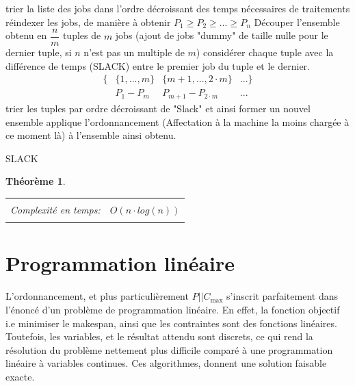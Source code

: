 \documentclass[a4paper,12pt]{report}
\theoremstyle{plain}				%
\newtheorem{theoreme}{Théorème}	%
\theoremstyle{definition}				%
\newcommand\problemGrahamP{$P||C_{\max}$\xspace}
\begin{document}
\bigskip
\begin{algorithm}[H]
\DontPrintSemicolon

trier la liste des jobs dans l'ordre décroissant des temps nécessaires de traitements \;
réindexer les jobs, de manière à obtenir $P_1 \geq P_2 \geq ... \geq P_n$ \;
Découper l'ensemble obtenu en $\dfrac{n}{m}$ tuples de $m$ jobs (ajout
de jobs "dummy" de taille nulle pour le dernier tuple, si $n$ n'est
pas un multiple de $m$) \;
considérer chaque tuple avec la différence de temps (SLACK) entre le
premier job du tuple et le dernier.
\begin{align*}
\{ &\{1, ..., m\} &\{m+1,..., 2 \cdot m\} &... \} \\
   &P_1 - P_m     &P_{m+1}-P_{2 \cdot m}  &...
\end{align*} \;
trier les tuples par ordre décroissant de "Slack" et ainsi former un nouvel ensemble
applique l'ordonnancement (Affectation à la machine la moins chargée à ce moment là) à l'ensemble ainsi obtenu.
\caption{SLACK\label{algo:SLACK}}
\end{algorithm}

\bigskip
\begin{theoreme}
\begin{flushleft}
\begin{tabular}{|p{8cm}p{6cm}|}
\hline
& \\
Complexité en temps:& $O(n \cdot log (n))$
\\
& \\
\hline
\end{tabular}
\end{flushleft}
\end{theoreme}


\section{Programmation linéaire}

L'ordonnancement, et plus particulièrement \problemGrahamP s'inscrit
parfaitement dans l'énoncé d'un problème de programmation linéaire.
En effet, la fonction objectif i.e minimiser le makespan, ainsi que
les contraintes sont des fonctions linéaires.
Toutefois, les variables, et le résultat attendu sont discrets, ce qui
rend la résolution du problème nettement plus difficile comparé à une
programmation linéaire à variables continues.
Ces algorithmes, donnent une solution faisable exacte.
\end{document}
